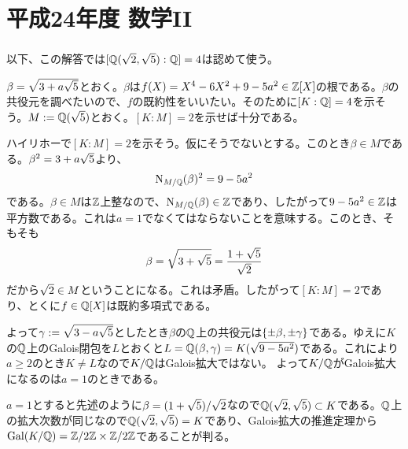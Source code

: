 \section{平成24年度 数学II}

\subsubsection{}%
\begin{sol}
  以下、この解答では$[{\mathbb Q}(\sqrt{2},\sqrt{5}): {\mathbb Q}] = 4$は認めて使う。

  $\beta = \sqrt{3 + a \sqrt{5}}$とおく。$\beta$は$f(X) = X^4 - 6X^2 + 9 -5a^2 \in {\mathbb Z}[X]$の根である。$\beta$の共役元を調べたいので、$f$の既約性をいいたい。そのために$[K:{\mathbb Q}]=4$を示そう。$M := {\mathbb Q}(\sqrt{5})$とおく。$[K:M]=2$を示せば十分である。

  ハイリホーで$[K:M]=2$を示そう。仮にそうでないとする。このとき$\beta \in M$である。$\beta^2 = 3 + a\sqrt{5}$より、
  \[
  \operatorname{N}_{M/{\mathbb Q}} (\beta)^2 = 9 - 5a^2
  \]
  である。$\beta \in M$は${\mathbb Z}$上整なので、$\operatorname{N}_{M/{\mathbb Q}} (\beta) \in {\mathbb Z}$であり、したがって$9 - 5a^2 \in {\mathbb Z}$は平方数である。これは$a=1$でなくてはならないことを意味する。このとき、そもそも
  \[
  \beta = \sqrt{3 + \sqrt{5}} = \frac{ 1 + \sqrt{5}}{ \sqrt{2}}
  \]
  だから$\sqrt{2} \in M$ということになる。これは矛盾。したがって$[K:M]=2$であり、とくに$f \in {\mathbb Q}[X]$は既約多項式である。

  よって${\gamma} := \sqrt{3 - a\sqrt{5}}$としたとき$\beta$の${\mathbb Q}$上の共役元は$\{ \pm \beta, \pm {\gamma} \}$である。ゆえに$K$の${\mathbb Q}$上のGalois閉包を$L$とおくと$L = {\mathbb Q}(\beta, {\gamma}) = K(\sqrt{9-5a^2})$である。これにより$a \geq 2$のとき$K \neq L$なので$K/{\mathbb Q}$はGalois拡大ではない。
  よって$K/{\mathbb Q}$がGalois拡大になるのは$a=1$のときである。

  $a=1$とすると先述のように$\beta = (1+\sqrt{5})/\sqrt{2}$なので${\mathbb Q}(\sqrt{2},\sqrt{5}) \subset K$である。${\mathbb Q}$上の拡大次数が同じなので${\mathbb Q}(\sqrt{2},\sqrt{5}) = K$であり、Galois拡大の推進定理から$\operatorname{Gal}(K/{\mathbb Q}) = \mathbb{Z} / 2 \mathbb{Z} \times \mathbb{Z} / 2 \mathbb{Z}$であることが判る。
\end{sol}

\newpage


